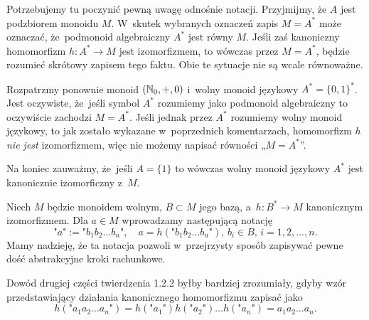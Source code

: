 \documentclass[a4paper,11pt]{article}
\begin{document}
\vspace{\spaceFour}





\start {} Potrzebujemy tu poczynić pewną uwagę odnośnie notacji.
Przyjmijmy, że $A$ jest podzbiorem monoidu $M$. W~skutek wybranych oznaczeń
zapis $M = A^{ * }$ może oznaczać, że~podmonoid algebraiczny $A^{ * }$ jest
równy $M$. Jeśli zaś kanoniczny homomorfizm $h : A^{ * } \to M$ jest
izomorfizmem, to wówczas przez $M = A^{ * }$, będzie rozumieć skrótowy zapisem tego faktu. Obie te sytuacje nie są wcale równoważne.

Rozpatrzmy ponownie monoid $( \mathbb{N}_{ 0 }, +, 0 )$ i~wolny monoid językowy
$A^{ * } = \{ 0, 1 \}^{ * }$. Jest oczywiste, że~jeśli symbol $A^{ * }$ rozumiemy
jako podmonoid algebraiczny to oczywiście zachodzi $M = A^{ * }$.
Jeśli jednak przez $A^{ * }$ rozumiemy wolny monoid językowy, to jak zostało
wykazane w~poprzednich komentarzach, homomorfizm $h$ \textit{nie jest}
izomorfizmem, więc nie możemy napisać równości „$M = A^{ * }$”.

Na koniec zauważmy, że~jeśli $A = \{ 1 \}$ to wówczas wolny monoid językowy
$A^{ * }$ jest kanonicznie izomorficzny z~$M$.

\vspace{\spaceFour}





\start {} Niech $M$ będzie monoidem wolnym, $B \subset M$ jego bazą,
a~$h : B^{ * } \to M$ kanonicznym izomorfizmem. Dla $a \in M$ wprowadzamy
następującą notację
\begin{equation}
  \label{eq:Forys-Forys-17}
  \texttt{"} a \texttt{"} :=
  \texttt{"} b_{ 1 } b_{ 2 } \ldots b_{ n } \texttt{"}, \quad
  a = h( \texttt{"} b_{ 1 } b_{ 2 } \ldots b_{ n } \texttt{"} ), \,
  b_{ i } \in B,\, i = 1, 2, \ldots, n.
\end{equation}
Mamy nadzieję, że ta notacja pozwoli w~przejrzysty sposób zapisywać pewne
dość abstrakcyjne kroki rachunkowe.

\vspace{\spaceFour}





\start {} Dowód drugiej części twierdzenia 1.2.2 byłby bardziej
zrozumiały, gdyby wzór przedstawiający działania kanonicznego homomorfizmu
zapisać jako
\begin{equation}
  \label{eq:Forys-Forys-18}
  h( \texttt{"} a_{ 1 } a_{ 2 } \ldots a_{ n } \texttt{"} ) =
  h( \texttt{"} a_{ 1 } \texttt{"} ) h( \texttt{"} a_{ 2 } \texttt{"} ) \ldots
  h( \texttt{"} a_{ n } \texttt{"} ) = a_{ 1 } a_{ 2 } \ldots a_{ n }.
\end{equation}
\end{document}
